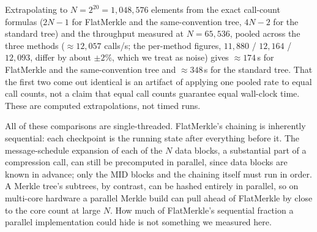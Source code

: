 Extrapolating to $N = 2^{20} = 1{,}048{,}576$ elements from the exact
call-count formulas ($2N-1$ for FlatMerkle and the same-convention tree,
$4N-2$ for the standard tree) and the throughput measured at
$N=65{,}536$, pooled across the three methods ($\approx 12{,}057$ calls/s;
the per-method figures, $11{,}880$ / $12{,}164$ / $12{,}093$, differ by
about $\pm2\%$, which we treat as noise) gives $\approx 174$\,s for
FlatMerkle and the same-convention tree and $\approx 348$\,s for the
standard tree. That the first two come out identical is an artifact of
applying one pooled rate to equal call counts, not a claim that equal call
counts guarantee equal wall-clock time. These are computed extrapolations,
not timed runs.

All of these comparisons are single-threaded. FlatMerkle's chaining is
inherently sequential: each checkpoint is the running state after
everything before it. The message-schedule expansion of each of the $N$
data blocks, a substantial part of a compression call, can still be
precomputed in parallel, since data blocks are known in advance; only the
$\mathrm{MID}$ blocks and the chaining itself must run in order. A Merkle
tree's subtrees, by contrast, can be hashed entirely in parallel, so on
multi-core hardware a parallel Merkle build can pull ahead of FlatMerkle
by close to the core count at large $N$. How much of FlatMerkle's
sequential fraction a parallel implementation could hide is not something
we measured here.
